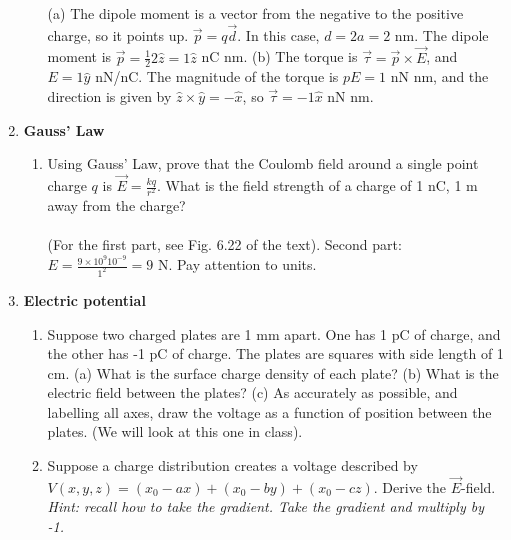 \documentclass[10pt]{article}
\begin{document}
\begin{enumerate}
\begin{enumerate}
(a) The dipole moment is a vector from the negative to the positive charge, so it points up.  $\vec{p} = q \vec{d}$.  In this case, $d = 2a = 2$ nm.  The dipole moment is $\vec{p} = \frac{1}{2} 2 \hat{z} = 1 \hat{z}$ nC nm. (b) The torque is $\vec{\tau} = \vec{p} \times \vec{E}$, and $E = 1 \hat{y}$ nN/nC.  The magnitude of the torque is $pE = 1$ nN nm, and the direction is given by $\hat{z} \times \hat{y} = -\hat{x}$, so $\vec{\tau} = -1 \hat{x}$ nN nm.
\end{enumerate}
\item \textbf{Gauss' Law}
\begin{enumerate}
\item Using Gauss' Law, prove that the Coulomb field around a single point charge $q$ is $\vec{E} = \frac{k q}{r^2}$.  What is the field strength of a charge of 1 nC, 1 m away from the charge? \\ \\
(For the first part, see Fig. 6.22 of the text).  Second part: $E = \frac{9 \times 10^9 10^{-9}}{1^2} = 9$ N.  Pay attention to units.
\end{enumerate}
\item \textbf{Electric potential}
\begin{enumerate}
\item Suppose two charged plates are 1 mm apart.  One has 1 pC of charge, and the other has -1 pC of charge.  The plates are squares with side length of 1 cm.  (a) What is the surface charge density of each plate?  (b) What is the electric field between the plates?  (c) As accurately as possible, and labelling all axes, draw the voltage as a function of position between the plates.  (We will look at this one in class).
\item Suppose a charge distribution creates a voltage described by $V(x,y,z) = (x_0 - a x) + (x_0 - b y) + (x_0 - c z)$.  Derive the $\vec{E}$-field.  \textit{Hint: recall how to take the gradient.  Take the gradient and multiply by -1.}
\end{enumerate}
\end{enumerate}
\end{document}
